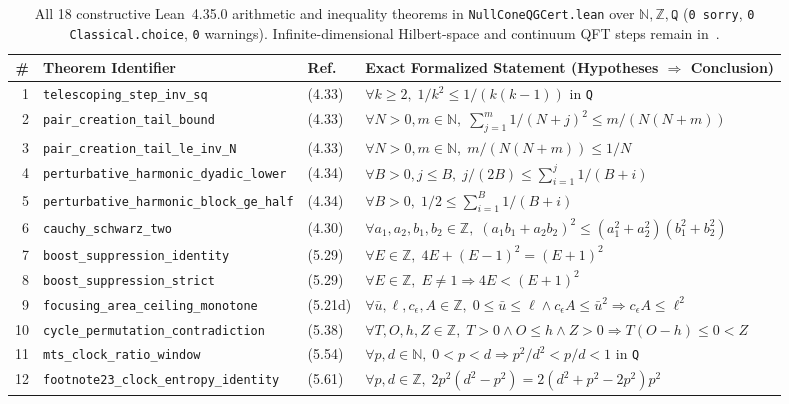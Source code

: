 \documentclass[10pt,twocolumn]{article}
\begin{document}
\begin{table}[tb]
\centering
\caption{All 18 constructive Lean~4.35.0 arithmetic and inequality theorems in \texttt{NullConeQGCert.lean} over $\mathbb{N}, \mathbb{Z}, \texttt{Q}$ (\texttt{0 sorry}, \texttt{0 Classical.choice}, \texttt{0} warnings). Infinite-dimensional Hilbert-space and continuum QFT steps remain in~\cite{Chandrasekaran2026}.}
\label{tab:lean}
\scriptsize
\setlength{\tabcolsep}{3.5pt}
\begin{tabular}{@{}rllp{7.4cm}@{}}
\toprule
\# & Theorem Identifier & Ref.~\cite{Chandrasekaran2026} & Exact Formalized Statement (Hypotheses $\Rightarrow$ Conclusion) \\
\midrule
1 & \texttt{telescoping\_step\_inv\_sq} & (4.33) & $\forall k \ge 2,\; 1/k^2 \le 1/(k(k-1))$ in \texttt{Q} \\
2 & \texttt{pair\_creation\_tail\_bound} & (4.33) & $\forall N>0, m\in\mathbb{N},\; \sum_{j=1}^m 1/(N+j)^2 \le m/(N(N+m))$ \\
3 & \texttt{pair\_creation\_tail\_le\_inv\_N} & (4.33) & $\forall N>0, m\in\mathbb{N},\; m/(N(N+m)) \le 1/N$ \\
4 & \texttt{perturbative\_harmonic\_dyadic\_lower} & (4.34) & $\forall B>0, j \le B,\; j/(2B) \le \sum_{i=1}^j 1/(B+i)$ \\
5 & \texttt{perturbative\_harmonic\_block\_ge\_half} & (4.34) & $\forall B>0,\; 1/2 \le \sum_{i=1}^B 1/(B+i)$ \\
6 & \texttt{cauchy\_schwarz\_two} & (4.30) & $\forall a_1,a_2,b_1,b_2\in\mathbb{Z},\; (a_1 b_1+a_2 b_2)^2 \le (a_1^2+a_2^2)(b_1^2+b_2^2)$ \\
7 & \texttt{boost\_suppression\_identity} & (5.29) & $\forall E\in\mathbb{Z},\; 4E + (E-1)^2 = (E+1)^2$ \\
8 & \texttt{boost\_suppression\_strict} & (5.29) & $\forall E\in\mathbb{Z},\; E\neq 1 \Rightarrow 4E < (E+1)^2$ \\
9 & \texttt{focusing\_area\_ceiling\_monotone} & (5.21d) & $\forall \bar u,\ell,c_\epsilon,A\in\mathbb{Z},\; 0\le\bar u\le\ell \wedge c_\epsilon A \le \bar u^2 \Rightarrow c_\epsilon A \le \ell^2$ \\
10 & \texttt{cycle\_permutation\_contradiction} & (5.38) & $\forall T,O,h,Z\in\mathbb{Z},\; T>0 \wedge O\le h \wedge Z>0 \Rightarrow T(O-h)\le 0 < Z$ \\
11 & \texttt{mts\_clock\_ratio\_window} & (5.54) & $\forall p,d\in\mathbb{N},\; 0 < p < d \Rightarrow p^2/d^2 < p/d < 1$ in \texttt{Q} \\
12 & \texttt{footnote23\_clock\_entropy\_identity} & (5.61) & $\forall p,d\in\mathbb{Z},\; 2p^2(d^2-p^2) = 2(d^2+p^2-2p^2)p^2$ \\

\end{tabular}
\end{table}
\end{document}
